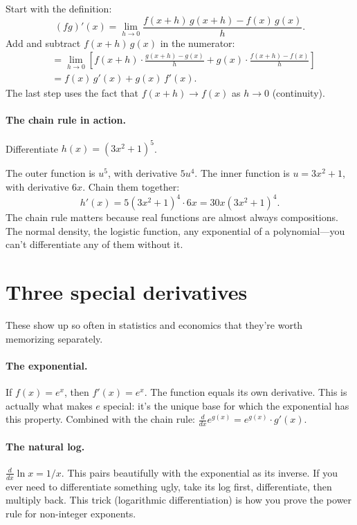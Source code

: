 Start with the definition:
\[
  (fg)'(x) = \lim_{h \to 0} \frac{f(x{+}h)\,g(x{+}h) - f(x)\,g(x)}{h}.
\]
Add and subtract $f(x{+}h)\,g(x)$ in the numerator:
\begin{align*}
  &= \lim_{h \to 0} \left[ f(x{+}h) \cdot \frac{g(x{+}h) - g(x)}{h} + g(x) \cdot \frac{f(x{+}h) - f(x)}{h} \right] \\
  &= f(x)\,g'(x) + g(x)\,f'(x).
\end{align*}
The last step uses the fact that $f(x+h) \to f(x)$ as $h \to 0$ (continuity).

\paragraph{The chain rule in action.} Differentiate $h(x) = (3x^2 + 1)^5$.

The outer function is $u^5$, with derivative $5u^4$. The inner function is $u = 3x^2 + 1$, with derivative $6x$. Chain them together:
\[
  h'(x) = 5(3x^2 + 1)^4 \cdot 6x = 30x(3x^2 + 1)^4.
\]
The chain rule matters because real functions are almost always compositions. The normal density, the logistic function, any exponential of a polynomial---you can't differentiate any of them without it.

\section{Three special derivatives}

These show up so often in statistics and economics that they're worth memorizing separately.

\paragraph{The exponential.} If $f(x) = e^x$, then $f'(x) = e^x$. The function equals its own derivative. This is actually what makes $e$ special: it's the unique base for which the exponential has this property. Combined with the chain rule: $\frac{d}{dx}e^{g(x)} = e^{g(x)} \cdot g'(x)$.

\paragraph{The natural log.} $\frac{d}{dx}\ln x = 1/x$. This pairs beautifully with the exponential as its inverse. If you ever need to differentiate something ugly, take its log first, differentiate, then multiply back. This trick (logarithmic differentiation) is how you prove the power rule for non-integer exponents.


